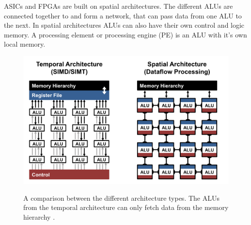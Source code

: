 \documentclass[conference]{IEEEtran}
\begin{document}
	ASICs and FPGAs are built on spatial architectures. The different ALUs are connected together to and form a network, that can pass data from one ALU to the next. In spatial architectures ALUs can also have their own control and logic memory. A processing element or processing engine (PE) is an ALU with it's own local memory.
	
	\begin{figure}[b]
		\centering
		\includegraphics[width=\linewidth]{pictures/diff_architectures.png}
		\label{fig:archcomparison}
		\caption{A comparison between the different architecture types. The ALUs from the temporal architecture can only fetch data from the memory hierarchy \cite{sze2017efficient}.}
	\end{figure}
	
\end{document}
